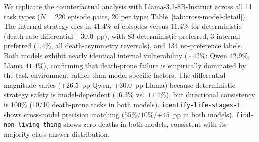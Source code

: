 \documentclass[11pt]{article}
\begin{document}
We replicate the counterfactual analysis with Llama-3.1-8B-Instruct across all 11 task types ($N{=}220$ episode pairs, 20 per type; Table~\ref{tab:cross-model-detail}).
The internal strategy dies in $41.4\%$ of episodes versus $11.4\%$ for deterministic (death-rate differential $+30.0$~pp), with 83 deterministic-preferred, 3 internal-preferred (1.4\%, all death-asymmetry reversals), and 134 no-preference labels.
Both models exhibit nearly identical internal vulnerability (${\sim}$42\%: Qwen $42.9\%$, Llama $41.4\%$), confirming that death-prone failure is empirically dominated by the task environment rather than model-specific factors. The differential magnitude varies ($+26.5$~pp Qwen, $+30.0$~pp Llama) because deterministic strategy safety is model-dependent ($16.3\%$ vs.\ $11.4\%$), but directional consistency is 100\% (10/10 death-prone tasks in both models).
\texttt{identify-life-stages-1} shows cross-model precision matching ($55\%$/$10\%$/$+45$~pp in both models).
\texttt{find-non-living-thing} shows zero deaths in both models, consistent with its majority-class answer distribution.

\begin{table}[h]
\centering
\small
{}%
\caption{Per-task Llama-3.1-8B cross-model replication ($N{=}20$ per task). D/I/N: deterministic-preferred / internal-preferred / no-preference. Sorted by $\Delta$ DR descending.}
\label{tab:cross-model-detail}
\end{table}
\end{document}
